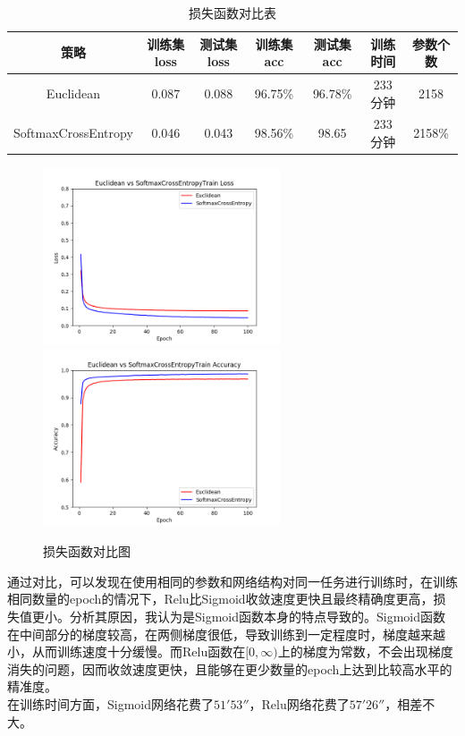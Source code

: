\documentclass[11pt,utf8]{article}
\begin{document}
            \begin{table}[h]
              \centering
              \begin{tabular}{|c|c|c|c|c|c|c|}\hline
                策略&训练集loss&测试集loss&训练集acc&测试集acc&训练时间&参数个数\\\hline
                Euclidean&0.087&0.088&96.75\%&96.78\%&233分钟&2158\\
                SoftmaxCrossEntropy&0.046&0.043&98.56\%&98.65&233分钟&2158\%\\\hline
              \end{tabular}
              \caption{损失函数对比表}
              \label{tab:Margin_settings}
            \end{table}

            \begin{figure}
              \begin{center}
                \includegraphics[width=7cm]{result/EuclideanvsSoftmaxCrossEntropy_loss.png}
                \includegraphics[width=7cm]{result/EuclideanvsSoftmaxCrossEntropy_acc.png}\\
                \caption{损失函数对比图}
              \end{center}
            \end{figure}
            
            \indent \indent 通过对比，可以发现在使用相同的参数和网络结构对同一任务进行训练时，在训练相同数量的epoch的情况下，Relu比Sigmoid收敛速度更快且最终精确度更高，损失值更小。分析其原因，我认为是Sigmoid函数本身的特点导致的。Sigmoid函数在中间部分的梯度较高，在两侧梯度很低，导致训练到一定程度时，梯度越来越小，从而训练速度十分缓慢。而Relu函数在$[0, \infty) $上的梯度为常数，不会出现梯度消失的问题，因而收敛速度更快，且能够在更少数量的epoch上达到比较高水平的精准度。\\
            \indent 在训练时间方面，Sigmoid网络花费了$51'53''$，Relu网络花费了$57'26''$，相差不大。
\end{document}
